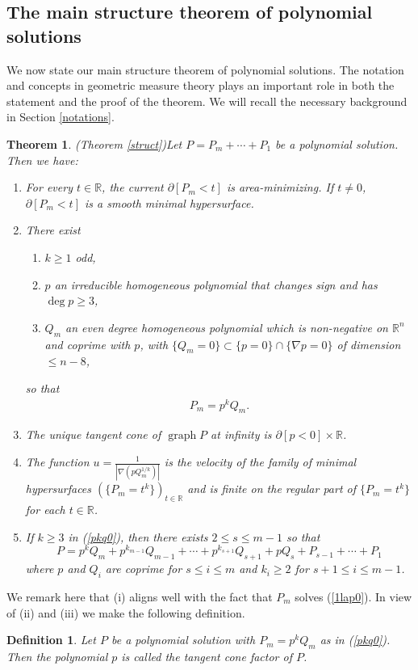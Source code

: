 \documentclass[pdflatex,sn-mathphys-num]{sn-jnl}%
\theoremstyle{thmstyleone}%
\newtheorem{theorem}{Theorem}[section]%
\theoremstyle{thmstyletwo}%
\theoremstyle{thmstylethree}%
\newtheorem{definition}{Definition}%
\newcommand{\R}{\mathbb{R}}
\DeclareMathOperator{\graph}{graph}
\begin{document}
\subsection{The main structure theorem of polynomial solutions}
We now state our main structure theorem of polynomial solutions.
The notation and concepts in geometric measure theory plays an important role in both the statement and the proof of the theorem. We will recall the necessary background in Section \ref{notations}. 
\begin{theorem}(Theorem \ref{struct})\label{struct0}
	Let $P=P_m+\cdots+P_1$ be a polynomial solution. Then we have:
	\begin{enumerate}
		\item[(i)] For every $t\in\R$, the current $\partial [P_m<t]$ is area-minimizing. If $t\neq0$, $\partial[P_m<t]$ is a smooth minimal hypersurface.
		\item[(ii)] There exist 
		\begin{enumerate}
			
			\item [(a)]$k\ge 1$ odd, 
			
			\item[(b)]$p $ an irreducible homogeneous polynomial that changes sign and has $\deg p\ge3$,
			
			\item[(c)] $Q_m$ an even degree homogeneous polynomial which is non-negative on $\R^n$ and coprime with $p $, with $\{Q_m=0\}\subset\{p=0\}\cap\{\nabla p=0\}$ of dimension $\le n-8$,
		\end{enumerate}
		so that
		\begin{align}\label{pkq0}
			P_m=p ^kQ_m.
		\end{align}
		
		\item[(iii)] The unique tangent cone of $\graph P$ at infinity is $\partial [p <0]\times \R$.
		
		\item[(iv)]The function $u=\frac{1}{|\nabla (p Q_m^{1/k})|}$ is the velocity of the family of minimal hypersurfaces $(\{P_m=t^k\})_{t\in\R}$ and is finite on the regular part of $\{P_m=t^k\}$ for each $t\in\R$.
		
		
		\item[(v)]  If $k\ge 3$ in (\ref{pkq0}), then there exists $2\le s\le m-1$ so that
		\[P=p ^kQ_m+p ^{k_{m-1}} Q_{m-1}+\cdots +p ^{k_{s+1}}Q_{s+1}+p Q_s+P_{s-1}+\cdots+P_1\]
		where  $p $ and $Q_i$ are coprime for $s\le i\le m$ and $k_i\ge 2$ for $s+1\le i\le m-1$.
	\end{enumerate}
\end{theorem}
We remark here that (i) aligns well with the fact that $P_m$ solves (\ref{1lap0}). In view of (ii) and (iii) we make the following definition.
\begin{definition}
	Let $P$ be a polynomial solution with $P_m=p^kQ_m$ as in (\ref{pkq0}). Then the polynomial $p$ is called the \textit{tangent cone factor} of $P$.
\end{definition}
\end{document}

